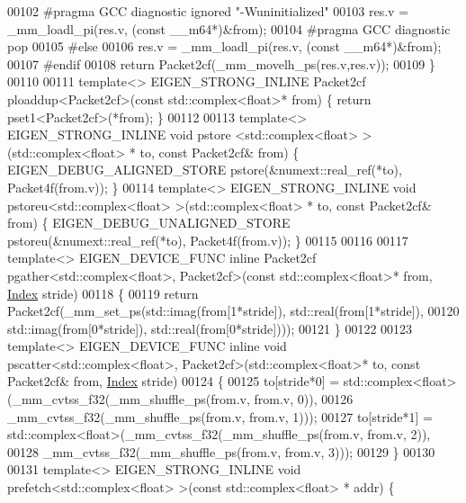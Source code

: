 \begin{DoxyCode}
00102 \textcolor{preprocessor}{  #pragma GCC diagnostic ignored "-Wuninitialized"}
00103   res.v = \_mm\_loadl\_pi(res.v, (\textcolor{keyword}{const} \_\_m64*)&from);
00104 \textcolor{preprocessor}{  #pragma GCC diagnostic pop}
00105 \textcolor{preprocessor}{#else}
00106   res.v = \_mm\_loadl\_pi(res.v, (\textcolor{keyword}{const} \_\_m64*)&from);
00107 \textcolor{preprocessor}{#endif}
00108   \textcolor{keywordflow}{return} Packet2cf(\_mm\_movelh\_ps(res.v,res.v));
00109 \}
00110 
00111 \textcolor{keyword}{template}<> EIGEN\_STRONG\_INLINE Packet2cf ploaddup<Packet2cf>(\textcolor{keyword}{const} std::complex<float>* from) \{ \textcolor{keywordflow}{return} 
      pset1<Packet2cf>(*from); \}
00112 
00113 \textcolor{keyword}{template}<> EIGEN\_STRONG\_INLINE \textcolor{keywordtype}{void} pstore <std::complex<float> >(std::complex<float> *   to, \textcolor{keyword}{const} 
      Packet2cf& from) \{ EIGEN\_DEBUG\_ALIGNED\_STORE pstore(&numext::real\_ref(*to), Packet4f(from.v)); \}
00114 \textcolor{keyword}{template}<> EIGEN\_STRONG\_INLINE \textcolor{keywordtype}{void} pstoreu<std::complex<float> >(std::complex<float> *   to, \textcolor{keyword}{const} 
      Packet2cf& from) \{ EIGEN\_DEBUG\_UNALIGNED\_STORE pstoreu(&numext::real\_ref(*to), Packet4f(from.v)); \}
00115 
00116 
00117 \textcolor{keyword}{template}<> EIGEN\_DEVICE\_FUNC \textcolor{keyword}{inline} Packet2cf pgather<std::complex<float>, Packet2cf>(\textcolor{keyword}{const} 
      std::complex<float>* from, \hyperlink{namespace_eigen_a62e77e0933482dafde8fe197d9a2cfde}{Index} stride)
00118 \{
00119   \textcolor{keywordflow}{return} Packet2cf(\_mm\_set\_ps(std::imag(from[1*stride]), std::real(from[1*stride]),
00120                               std::imag(from[0*stride]), std::real(from[0*stride])));
00121 \}
00122 
00123 \textcolor{keyword}{template}<> EIGEN\_DEVICE\_FUNC \textcolor{keyword}{inline} \textcolor{keywordtype}{void} pscatter<std::complex<float>, Packet2cf>(std::complex<float>* to, \textcolor{keyword}{
      const} Packet2cf& from, \hyperlink{namespace_eigen_a62e77e0933482dafde8fe197d9a2cfde}{Index} stride)
00124 \{
00125   to[stride*0] = std::complex<float>(\_mm\_cvtss\_f32(\_mm\_shuffle\_ps(from.v, from.v, 0)),
00126                                      \_mm\_cvtss\_f32(\_mm\_shuffle\_ps(from.v, from.v, 1)));
00127   to[stride*1] = std::complex<float>(\_mm\_cvtss\_f32(\_mm\_shuffle\_ps(from.v, from.v, 2)),
00128                                      \_mm\_cvtss\_f32(\_mm\_shuffle\_ps(from.v, from.v, 3)));
00129 \}
00130 
00131 \textcolor{keyword}{template}<> EIGEN\_STRONG\_INLINE \textcolor{keywordtype}{void} prefetch<std::complex<float> >(\textcolor{keyword}{const} std::complex<float> *   addr) \{ 

\end{DoxyCode}
